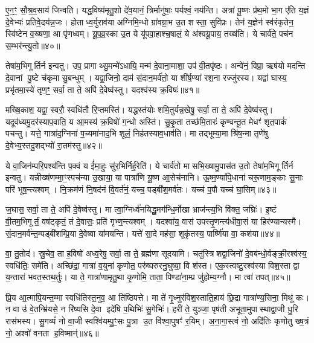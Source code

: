 ए॒न॒ꣳ॒ सौ॒श्र॒व॒साय॑ जिन्वति। यद्ध॒विष्य॑मृतु॒शो दे॑व॒यानं॒ त्रिर्मानु॑षाः॒ पर्यश्वं॒ नय॑न्ति। अत्रा॑ पू॒ष्णः प्र॑थ॒मो भा॒ग ए॑ति य॒ज्ञं दे॒वेभ्यः॑ प्रतिवे॒दय॑न्न॒जः। होताध्व॒र्युराव॑या अग्निमि॒न्धो ग्रा॑वग्रा॒भ उ॒त शस्ता॒ सुवि॑प्रः। तेन॑ य॒ज्ञेन॑ स्व॑रंकृतेन॒ स्वि॑ष्टेन व॒ख्षणा॒ आ पृ॑णध्वम्। यू॒प॒व्र॒स्का उ॒त ये यू॑पवा॒हाश्च॒षालं॒ ये अ॑श्वयू॒पाय॒ तख्ष॑ति। ये चार्व॑ते॒ पच॑न स॒म्भर॑न्त्यु॒तो॥४०॥

तेषा॑म॒भिगूर्तिर्न इन्वतु। उप॒ प्रागाथ्सु॒मन्मे॑ऽधायि॒ मन्म॑ दे॒वाना॒माशा॒ उप॑ वी॒तपृ॑ष्ठः। अन्वे॑नं॒ विप्रा॒ ऋष॑यो मदन्ति दे॒वानां पु॒ष्टे च॑कृमा सु॒बन्धुम्। यद्वा॒जिनो॒ दाम॑ सं॒दान॒मर्व॑तो॒ या शी॑र्\mbox{}ष॒ण्या॑ रश॒ना रज्जु॑रस्य। यद्वा॑ घास्य॒ प्रभृ॑तमा॒स्ये॑ तृण॒ꣳ॒ सर्वा॒ ता ते॒ अपि॑ दे॒वेष्व॑स्तु। यदश्व॑स्य क्र॒विषः॑॥४१॥

मख्षि॒काश॒ यद्वा॒ स्वरौ॒ स्वधि॑तौ रि॒प्तमस्ति॑। यद्धस्त॑योः शमि॒तुर्यन्न॒खेषु॒ सर्वा॒ ता ते॒ अपि॑ दे॒वेष्व॑स्तु। यदूव॑ध्यमु॒दर॑स्याप॒वाति॒ य आ॒मस्य॑ क्र॒विषो॑ ग॒न्धो अस्ति॑। सु॒कृ॒ता तच्छ॑मि॒तारः॑ कृण्वन्तू॒त मेधꣳ॑ शृत॒पाकं॑ पचन्तु। यत्ते॒ गात्रा॑द॒ग्निना॑ प॒च्यमा॑नाद॒भि शूलं॒ निह॑तस्याव॒धाव॑ति। मा तद्भूम्या॒मा श्रि॑ष॒न्मा तृणे॑षु दे॒वेभ्य॒स्तदु॒शद्भ्यो॑ रा॒तम॑स्तु॥४२॥

{\anuvakamend[{इदु॒तो क्र॒विषः॑ श्रिषथ्स॒प्त च॑॥८॥}]}

ये वा॒जिन॑म्परि॒पश्य॑न्ति प॒क्वं य ई॑मा॒हुः सु॑र॒भिर्निर्\mbox{}ह॒रेति॑। ये चार्व॑तो मासभि॒ख्षामु॒पास॑त उ॒तो तेषा॑म॒भिगूर्तिर्न इन्वतु। यन्नीख्ष॑णम्मा॒ꣳ॒स्पच॑न्या उ॒खाया॒ या पात्रा॑णि यू॒ष्ण आ॒सेच॑नानि। ऊ॒ष्म॒ण्या॑पि॒धाना॑ चरू॒णाम॒ङ्काः सू॒नाः परि॑ भूष॒न्त्यश्वम्। नि॒क्रम॑णं नि॒षद॑नं वि॒वर्त॑नं॒ यच्च॒ पड्बी॑श॒मर्व॑तः। यच्च॑ प॒पौ यच्च॑ घा॒सिम्॥४३॥

ज॒घास॒ सर्वा॒ ता ते॒ अपि॑ दे॒वेष्व॑स्तु। मा त्वा॒ग्निर्ध्व॑नयिद्धू॒मग॑न्धि॒र्मोखा भ्राज॑न्त्य॒भि वि॑क्त॒ जघ्रिः॑। इ॒ष्टं वी॒तम॒भिगूर्तं॒ वष॑ट्कृतं॒ तं दे॒वासः॒ प्रति॑ गृभ्ण॒न्त्यश्वम्। यदश्वा॑य॒ वास॑ उपस्तृ॒णन्त्य॑धीवा॒सं या हिर॑ण्यान्यस्मै। सं॒दान॒मर्व॑न्त॒म्पड्बी॑शम्प्रि॒या दे॒वेष्वा या॑मयन्ति। यत्ते॑ सा॒दे मह॑सा॒ शूकृ॑तस्य॒ पार्ष्णि॑या वा॒ कश॑या॥४४॥

वा॒ तु॒तोद॑। स्रु॒चेव॒ ता ह॒विषो॑ अध्व॒रेषु॒ सर्वा॒ ता ते॒ ब्रह्म॑णा सूदयामि। चतु॑स्त्रिशद्वा॒जिनो॑ दे॒वब॑न्धो॒र्वङ्क्री॒रश्व॑स्य॒ स्वधि॑तिः॒ समे॑ति। अच्छि॑द्रा॒ गात्रा॑ व॒युना॑ कृणोत॒ परु॑ष्परुरनु॒घुष्या॒ वि श॑स्त। एक॒स्त्वष्टु॒रश्व॑स्या विश॒स्ता द्वा य॒न्तारा॑ भवत॒स्तथ॒र्तुः। या ते॒ गात्रा॑णामृतु॒था कृ॒णोमि॒ ताता॒ पिण्डा॑ना॒म्प्र जु॑होम्य॒ग्नौ। मा त्वा॑ तपत्॥४५॥

प्रि॒य आ॒त्मापि॒यन्त॒म्मा स्वधि॑तिस्त॒नुव॒ आ ति॑ष्ठिपत्ते। मा ते॑ गृ॒ध्नुर॑विश॒स्ताति॒हाय॑ छि॒द्रा गात्रा॑ण्य॒सिना॒ मिथू॑ कः। न वा उ॑ वे॒तन्म्रि॑यसे॒ न रि॑ष्यसि दे॒वा इदे॑षि प॒थिभिः॑ सु॒गेभिः॑। हरी॑ ते॒ युञ्जा॒ पृष॑ती अभूता॒मुपास्थाद्वा॒जी धु॒रि रास॑भस्य। सु॒गव्यं॑ नो वा॒जी स्वश्वि॑यम्पु॒ꣳ॒सः पु॒त्रा उ॒त वि॑श्वा॒पुषꣳ॑ र॒यिम्। अ॒ना॒गा॒स्त्वं नो॒ अदि॑तिः कृणोतु ख्ष॒त्रं नो॒ अश्वो॑ वनता ह॒विष्मान्॑॥४६॥

